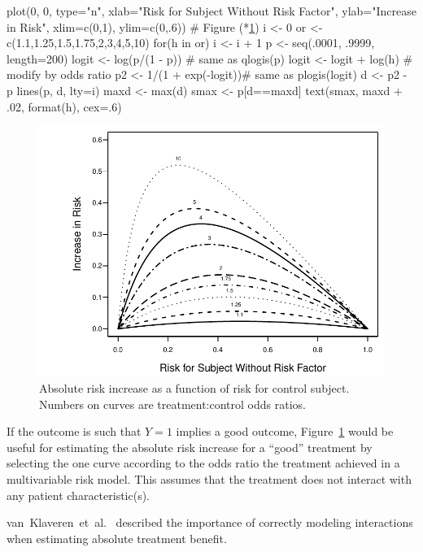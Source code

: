 \begin{Schunk}
\begin{Sinput}
plot(0, 0, type="n", xlab="Risk for Subject Without Risk Factor",
     ylab="Increase in Risk",
     xlim=c(0,1), ylim=c(0,.6))   # Figure (*\ref{fig:ancova-or-diff}\ipacue*)
i <- 0
or <- c(1.1,1.25,1.5,1.75,2,3,4,5,10)
for(h in or) {
  i <- i + 1
  p <- seq(.0001, .9999, length=200)
  logit <- log(p/(1 - p))  # same as qlogis(p)
  logit <- logit + log(h)  # modify by odds ratio
  p2 <- 1/(1 + exp(-logit))# same as plogis(logit)
  d <- p2 - p
  lines(p, d, lty=i)
  maxd <- max(d)
  smax <- p[d==maxd]
  text(smax, maxd + .02, format(h), cex=.6)
}
\end{Sinput}
\begin{figure}[htbp]

\centerline{\includegraphics{ancova-or-diff-1} }

\caption[Absolute risk increase as a function of risk]{Absolute risk increase as a function of risk for control subject.  Numbers on curves are treatment:control odds ratios.}\label{fig:ancova-or-diff}
\end{figure}
\end{Schunk}
If the outcome is such that $Y=1$ implies a good outcome,
Figure~\ref{fig:ancova-or-diff} would be useful for estimating the
absolute risk increase for a ``good'' treatment by selecting the one
curve according to the odds ratio the treatment achieved in a
multivariable risk model.  This assumes that the treatment does not
interact with any patient characteristic(s).

van~Klaveren~et~al.~\cite{kla15est} described the importance of correctly modeling interactions when estimating absolute treatment benefit.

